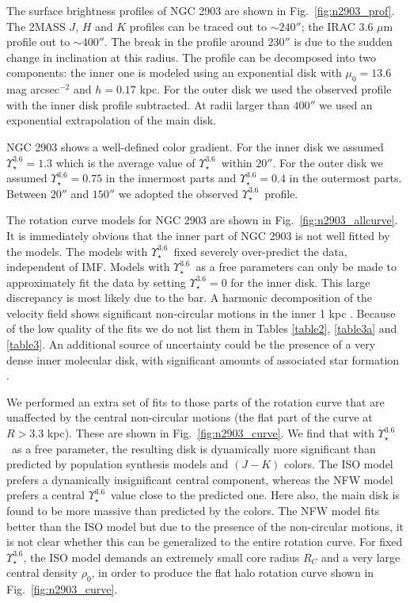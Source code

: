 \documentclass[usenatbib,usegraphicx,apjfonts,floatfix]{emulateapj}
\newcommand{\Ups}{\ensuremath{\Upsilon_{\star}^{3.6}}}
\begin{document}
The surface brightness profiles of NGC 2903 are shown in
Fig.~\ref{fig:n2903_prof}. The 2MASS $J$, $H$ and $K$ profiles can be
traced out to $\sim 240''$; the IRAC 3.6 $\mu$m profile out to $\sim
400''$.  The break in the profile around $230''$ is due to the sudden
change in inclination at this radius.  The profile can be
decomposed into two components: the inner one is modeled using an
exponential disk with $\mu_0= 13.6$ mag arcsec$^{-2}$ and $h = 0.17$
kpc. For the outer disk we used the observed profile with the inner
disk profile subtracted. At radii larger than $400''$ we used an
exponential extrapolation of the main disk.

NGC 2903 shows a well-defined color gradient. For the inner disk we
assumed $\Ups = 1.3$ which is the average value of \Ups\ within
$20''$. For the outer disk we assumed $\Ups=0.75$ in the innermost
parts and $\Ups=0.4$ in the outermost parts. Between $20''$ and
$150''$ we adopted the observed \Ups\ profile.

The rotation curve models for NGC 2903 are shown in
Fig.~\ref{fig:n2903_allcurve}. It is immediately obvious that the
inner part of NGC 2903 is not well fitted by the models.  The models
with \Ups\ fixed severely over-predict the data, independent of IMF.
Models with \Ups\ as a free parameters can only be made to
approximately fit the data by setting $\Ups=0$ for the inner disk.
This large discrepancy is most likely due to the bar. A harmonic
decomposition of the velocity field shows significant non-circular
motions in the inner 1 kpc \citep{clemens2007}. Because of the low
quality of the fits we do not list them in Tables \ref{table2},
\ref{table3a} and \ref{table3}.  An additional source of uncertainty
could be the presence of a very dense inner molecular disk, with
significant amounts of associated star formation \citep{2903disk}.

We performed an extra set of fits to those parts of the rotation curve
that are unaffected by the central non-circular motions 
(the flat part of the curve at $R>3.3$ kpc). These are shown in 
Fig.~\ref{fig:n2903_curve}.  We find that with \Ups\ as a free
parameter, the resulting disk is dynamically more significant than
predicted by population synthesis models and $(J-K)$ colors. The ISO
model prefers a dynamically insignificant central component, whereas
the NFW model prefers a central \Ups\ value close to the predicted
one. Here also, the main disk is found to be more massive than
predicted by the colors. The NFW model fits better than the ISO model
but due to the presence of the non-circular motions, it is not clear
whether this can be generalized to the entire rotation curve.
For fixed \Ups, the ISO model demands an extremely small core radius $R_C$ and
a very large central density $\rho_0$, in order to produce the flat
halo rotation curve shown in Fig.~\ref{fig:n2903_curve}.
\end{document}
